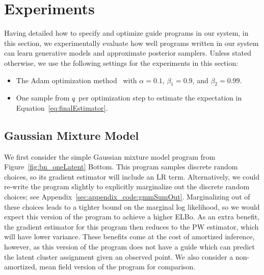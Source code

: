 \section{Experiments}
\label{sec:results}

Having detailed how to specify and optimize guide programs in our system, in this section, we experimentally evaluate how well programs written in our system can learn generative models and approximate posterior samplers. Unless stated otherwise, we use the following settings for the experiments in this section:
\begin{itemize}
\item{The Adam optimization method~\cite{Adam} with $\alpha = 0.1$, $\beta_1 = 0.9$, and $\beta_2 = 0.99$.}
\item{One sample from $q$ per optimization step to estimate the expectation in Equation~\ref{eq:finalEstimator}.}
\end{itemize}


\subsection{Gaussian Mixture Model}
\label{sec:results_gmm}

We first consider the simple Gaussian mixture model program from Figure~\ref{fig:bn_oneLatent} Bottom. This program samples discrete random choices, so its gradient estimator will include an LR term. Alternatively, we could re-write the program slightly to explicitly marginalize out the discrete random choices; see Appendix~\ref{sec:appendix_code:gmmSumOut}.
Marginalizing out of these choices leads to a tighter bound on the marginal log likelihood, so we would expect this version of the program to achieve a higher ELBo.
As an extra benefit, the gradient estimator for this program then reduces to the PW estimator, which will have lower variance. These benefits come at the cost of amortized inference, however, as this version of the program does not have a guide which can predict the latent cluster assignment given an observed point. We also consider a non-amortized, mean field version of the program for comparison.

